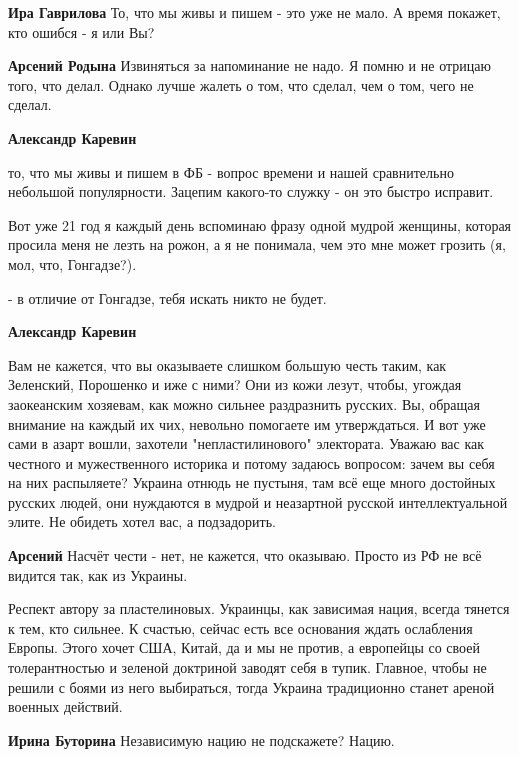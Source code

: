 \begin{itemize}
\begin{itemize}
\textbf{Ира Гаврилова} То, что мы живы и пишем - это уже не мало. А время покажет, кто ошибся - я или Вы?

\textbf{Арсений Родына} Извиняться за напоминание не надо. Я помню и не отрицаю того, что делал. Однако лучше жалеть о том, что сделал, чем о том, чего не сделал.

\textbf{Александр Каревин} 

то, что мы живы и пишем в ФБ - вопрос времени и нашей сравнительно небольшой
популярности. Зацепим какого-то служку - он это быстро исправит.

Вот уже 21 год я каждый день вспоминаю фразу одной мудрой женщины, которая
просила меня не лезть на рожон, а я не понимала, чем это мне может грозить (я,
мол, что, Гонгадзе?).

- в отличие от Гонгадзе, тебя искать никто не будет.

\textbf{Александр Каревин} 

Вам не кажется, что вы оказываете слишком большую честь таким, как Зеленский,
Порошенко и иже с ними? Они из кожи лезут, чтобы, угождая заокеанским хозяевам,
как можно сильнее раздразнить русских. Вы, обращая внимание на каждый их чих,
невольно помогаете им утверждаться. И вот уже сами в азарт вошли, захотели
"непластилинового" электората. Уважаю вас как честного и мужественного историка
и потому задаюсь вопросом: зачем вы себя на них распыляете? Украина отнюдь не
пустыня, там всё еще много достойных русских людей, они нуждаются в мудрой и
неазартной русской интеллектуальной элите. Не обидеть хотел вас, а подзадорить.

\textbf{Арсений} Насчёт чести - нет, не кажется, что оказываю. Просто из РФ не всё видится так, как из Украины.
\end{itemize} %


Респект автору за пластелиновых. Украинцы, как зависимая нация, всегда тянется
к тем, кто сильнее. К счастью, сейчас есть все основания ждать ослабления
Европы. Этого хочет США, Китай, да и мы не против, а европейцы со своей
толерантностью и зеленой доктриной заводят себя в тупик. Главное, чтобы не
решили с боями из него выбираться, тогда Украина традиционно станет ареной
военных действий.

\begin{itemize} %
\textbf{Ирина Буторина} Независимую нацию не подскажете? Нацию.


\end{itemize}
\end{itemize}
